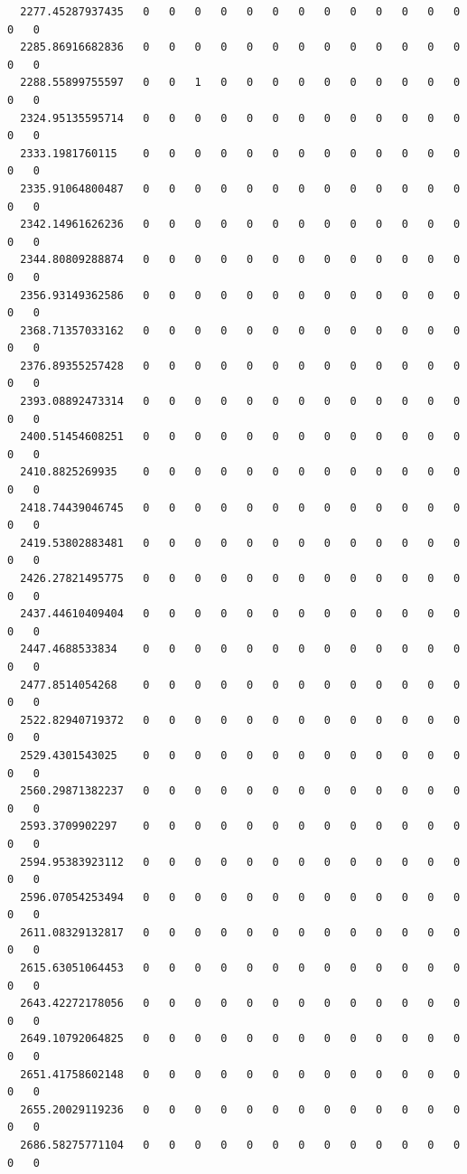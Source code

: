 \documentclass[
  letterpaper,
  DIV=11,
  numbers=noendperiod]{scrartcl}
\begin{document}
\begin{verbatim}
  2277.45287937435   0   0   0   0   0   0   0   0   0   0   0   0   0   0   0
  2285.86916682836   0   0   0   0   0   0   0   0   0   0   0   0   0   0   0
  2288.55899755597   0   0   1   0   0   0   0   0   0   0   0   0   0   0   0
  2324.95135595714   0   0   0   0   0   0   0   0   0   0   0   0   0   0   0
  2333.1981760115    0   0   0   0   0   0   0   0   0   0   0   0   0   0   0
  2335.91064800487   0   0   0   0   0   0   0   0   0   0   0   0   0   0   0
  2342.14961626236   0   0   0   0   0   0   0   0   0   0   0   0   0   0   0
  2344.80809288874   0   0   0   0   0   0   0   0   0   0   0   0   0   0   0
  2356.93149362586   0   0   0   0   0   0   0   0   0   0   0   0   0   0   0
  2368.71357033162   0   0   0   0   0   0   0   0   0   0   0   0   0   0   0
  2376.89355257428   0   0   0   0   0   0   0   0   0   0   0   0   0   0   0
  2393.08892473314   0   0   0   0   0   0   0   0   0   0   0   0   0   0   0
  2400.51454608251   0   0   0   0   0   0   0   0   0   0   0   0   0   0   0
  2410.8825269935    0   0   0   0   0   0   0   0   0   0   0   0   0   0   0
  2418.74439046745   0   0   0   0   0   0   0   0   0   0   0   0   0   0   0
  2419.53802883481   0   0   0   0   0   0   0   0   0   0   0   0   0   0   0
  2426.27821495775   0   0   0   0   0   0   0   0   0   0   0   0   0   0   0
  2437.44610409404   0   0   0   0   0   0   0   0   0   0   0   0   0   0   0
  2447.4688533834    0   0   0   0   0   0   0   0   0   0   0   0   0   0   0
  2477.8514054268    0   0   0   0   0   0   0   0   0   0   0   0   0   0   0
  2522.82940719372   0   0   0   0   0   0   0   0   0   0   0   0   0   0   0
  2529.4301543025    0   0   0   0   0   0   0   0   0   0   0   0   0   0   0
  2560.29871382237   0   0   0   0   0   0   0   0   0   0   0   0   0   0   0
  2593.3709902297    0   0   0   0   0   0   0   0   0   0   0   0   0   0   0
  2594.95383923112   0   0   0   0   0   0   0   0   0   0   0   0   0   0   0
  2596.07054253494   0   0   0   0   0   0   0   0   0   0   0   0   0   0   0
  2611.08329132817   0   0   0   0   0   0   0   0   0   0   0   0   0   0   0
  2615.63051064453   0   0   0   0   0   0   0   0   0   0   0   0   0   0   0
  2643.42272178056   0   0   0   0   0   0   0   0   0   0   0   0   0   0   0
  2649.10792064825   0   0   0   0   0   0   0   0   0   0   0   0   0   0   0
  2651.41758602148   0   0   0   0   0   0   0   0   0   0   0   0   0   0   0
  2655.20029119236   0   0   0   0   0   0   0   0   0   0   0   0   0   0   0
  2686.58275771104   0   0   0   0   0   0   0   0   0   0   0   0   0   0   0

\end{verbatim}
\end{document}
